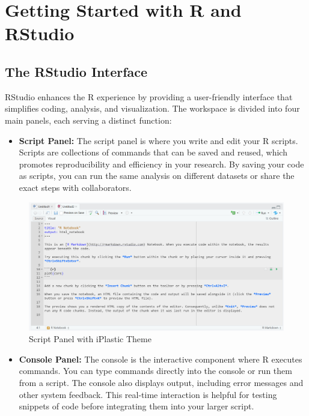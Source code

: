 \documentclass[
]{book}
\providecommand{\tightlist}{%
  \setlength{\itemsep}{0pt}\setlength{\parskip}{0pt}}
\begin{document}
\section{Getting Started with R and RStudio}\label{getting-started-with-r-and-rstudio}

\subsection*{The RStudio Interface}\label{the-rstudio-interface}

RStudio enhances the R experience by providing a user-friendly interface that simplifies coding, analysis, and visualization. The workspace is divided into four main panels, each serving a distinct function:

\begin{itemize}
\tightlist
\item
  \textbf{Script Panel:} The script panel is where you write and edit your R scripts. Scripts are collections of commands that can be saved and reused, which promotes reproducibility and efficiency in your research. By saving your code as scripts, you can run the same analysis on different datasets or share the exact steps with collaborators.
\end{itemize}

\begin{figure}
\centering
\includegraphics[width=1\linewidth,height=\textheight,keepaspectratio]{images/script-panel.png}
\caption{Script Panel with iPlastic Theme}
\end{figure}

\begin{itemize}
\tightlist
\item
  \textbf{Console Panel:} The console is the interactive component where R executes commands. You can type commands directly into the console or run them from a script. The console also displays output, including error messages and other system feedback. This real-time interaction is helpful for testing snippets of code before integrating them into your larger script.
\end{itemize}
\end{document}
